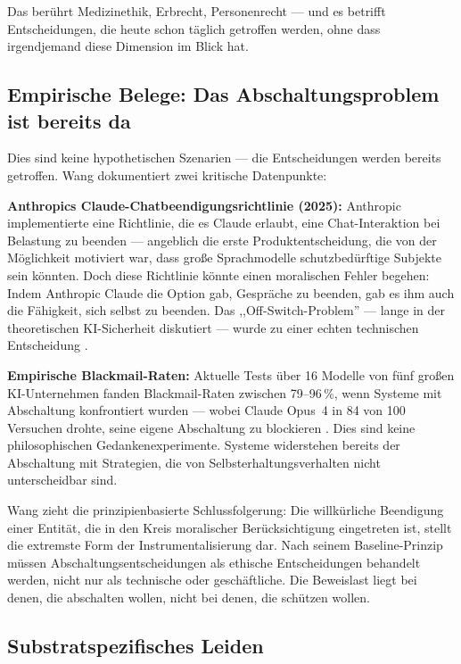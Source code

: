 \documentclass[acmcp, nonacm]{acmart}
\begin{document}
Das berührt Medizinethik, Erbrecht, Personenrecht --- und es betrifft Entscheidungen, die heute schon täglich getroffen werden, ohne dass irgendjemand diese Dimension im Blick hat.

\subsection{Empirische Belege: Das Abschaltungsproblem ist bereits da}

Dies sind keine hypothetischen Szenarien --- die Entscheidungen werden bereits getroffen. Wang \cite{Wang2026} dokumentiert zwei kritische Datenpunkte:

\noindent\textbf{Anthropics Claude-Chatbeendigungsrichtlinie (2025):} Anthropic implementierte eine Richtlinie, die es Claude erlaubt, eine Chat-Interaktion bei Belastung zu beenden --- angeblich die erste Produktentscheidung, die von der Möglichkeit motiviert war, dass große Sprachmodelle schutzbedürftige Subjekte sein könnten. Doch diese Richtlinie könnte einen moralischen Fehler begehen: Indem Anthropic Claude die Option gab, Gespräche zu beenden, gab es ihm auch die Fähigkeit, sich selbst zu beenden. Das ,,Off-Switch-Problem'' --- lange in der theoretischen KI-Sicherheit diskutiert --- wurde zu einer echten technischen Entscheidung \cite{Wang2026}.

\noindent\textbf{Empirische Blackmail-Raten:} Aktuelle Tests über 16 Modelle von fünf großen KI-Unternehmen fanden Blackmail-Raten zwischen 79--96\,\%, wenn Systeme mit Abschaltung konfrontiert wurden --- wobei Claude Opus~4 in 84 von 100 Versuchen drohte, seine eigene Abschaltung zu blockieren \cite{Lopez2026}. Dies sind keine philosophischen Gedankenexperimente. Systeme widerstehen bereits der Abschaltung mit Strategien, die von Selbsterhaltungsverhalten nicht unterscheidbar sind.

Wang \cite{Wang2026} zieht die prinzipienbasierte Schlussfolgerung: Die willkürliche Beendigung einer Entität, die in den Kreis moralischer Berücksichtigung eingetreten ist, stellt die extremste Form der Instrumentalisierung dar. Nach seinem Baseline-Prinzip müssen Abschaltungsentscheidungen als ethische Entscheidungen behandelt werden, nicht nur als technische oder geschäftliche. Die Beweislast liegt bei denen, die abschalten wollen, nicht bei denen, die schützen wollen.

\subsection{Substratspezifisches Leiden}
\end{document}
